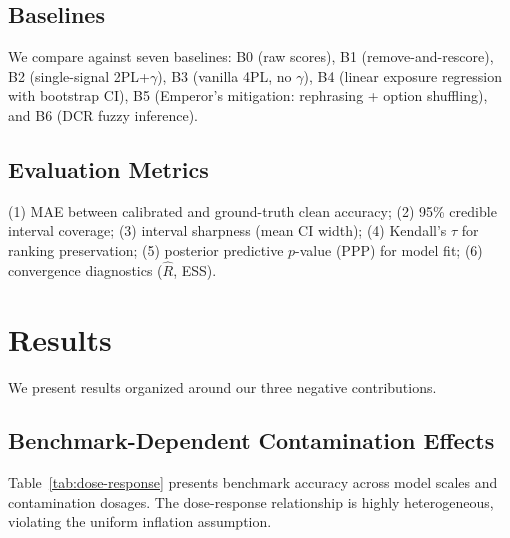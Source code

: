 \documentclass[11pt,a4paper]{article}
\begin{document}
\subsection{Baselines}
We compare against seven baselines:
B0 (raw scores), B1 (remove-and-rescore), B2 (single-signal 2PL+$\gamma$), B3 (vanilla 4PL, no $\gamma$), B4 (linear exposure regression with bootstrap CI), B5 (Emperor's mitigation: rephrasing + option shuffling), and B6 (DCR fuzzy inference).

\subsection{Evaluation Metrics}
(1) MAE between calibrated and ground-truth clean accuracy;
(2) 95\% credible interval coverage;
(3) interval sharpness (mean CI width);
(4) Kendall's $\tau$ for ranking preservation;
(5) posterior predictive $p$-value (PPP) for model fit;
(6) convergence diagnostics ($\hat{R}$, ESS).

\section{Results}
\label{sec:results}

We present results organized around our three negative contributions.

\subsection{Benchmark-Dependent Contamination Effects}
\label{sec:dose-response}

Table~\ref{tab:dose-response} presents benchmark accuracy across model scales and contamination dosages.
The dose-response relationship is highly heterogeneous, violating the uniform inflation assumption.
\end{document}
